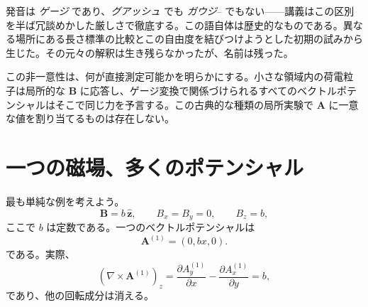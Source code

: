 発音は \emph{ゲージ} であり、\emph{グアッシュ} でも \emph{ガウジ}-- でもない——講義はこの区別を半ば冗談めかした厳しさで徹底する。この語自体は歴史的なものである。異なる場所にある長さ標準の比較とこの自由度を結びつけようとした初期の試みから生じた。その元々の解釈は生き残らなかったが、名前は残った。

\begin{classroomqa}
\end{classroomqa}

この非一意性は、何が直接測定可能かを明らかにする。小さな領域内の荷電粒子は局所的な \(\mathbf B\) に応答し、ゲージ変換で関係づけられるすべてのベクトルポテンシャルはそこで同じ力を予言する。この古典的な種類の局所実験で \(\mathbf A\) に一意な値を割り当てるものは存在しない。

\begin{classroomqa}
\end{classroomqa}

\begin{classroomqa}
\end{classroomqa}

\section{一つの磁場、多くのポテンシャル}

最も単純な例を考えよう。
\begin{equation}
  \mathbf B=b\,\hat{\mathbf z},
  \qquad
  B_x=B_y=0,
  \qquad
  B_z=b,
\end{equation}
ここで \(b\) は定数である。一つのベクトルポテンシャルは
\begin{equation}
  \mathbf A^{(1)}=(0,bx,0).
\end{equation}
である。実際、
\begin{equation}
  (\nabla\times\mathbf A^{(1)})_z
  =
  \frac{\partial A_y^{(1)}}{\partial x}
  -\frac{\partial A_x^{(1)}}{\partial y}
  =b,
\end{equation}
であり、他の回転成分は消える。

